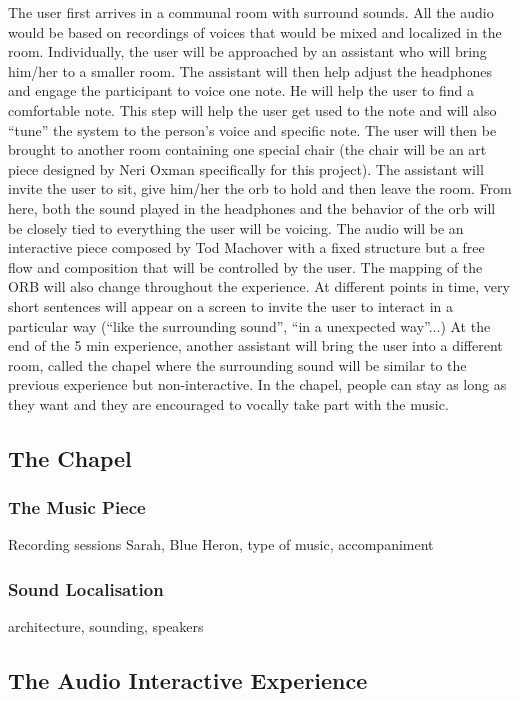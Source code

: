 \documentclass{nime-alternate}
\begin{document}
The user first arrives in a communal room with surround sounds. All the audio would be based on recordings of voices that would be mixed and localized in the room. Individually, the user will be approached by an assistant who will bring him/her to a smaller room. The assistant will then help adjust the headphones and engage the participant to voice one note. He will help the user to find a comfortable note. This step will help the user get used to the note and will also “tune” the system to the person’s voice and specific note. The user will then be brought to another room containing one special chair (the chair will be an art piece designed by Neri Oxman specifically for this project). The assistant will invite the user to sit, give him/her the orb to hold and then leave the room. From here, both the sound played in the headphones and the behavior of the orb will be closely tied to everything the user will be voicing. The audio will be an interactive piece composed by Tod Machover with a fixed structure but a free flow and composition that will be controlled by the user. The mapping of the ORB will also change throughout the experience. At different points in time, very short sentences will appear on a screen to invite the user to interact in a particular way (“like the surrounding sound”, “in a unexpected way”...) At the end of the 5 min experience, another assistant will bring the user into a different room, called the chapel where the surrounding sound will be similar to the previous experience but non-interactive. In the chapel, people can stay as long as they want and they are encouraged to vocally take part with the music.


\subsection{The Chapel}

\subsubsection{The Music Piece}
Recording sessions
Sarah, Blue Heron, type of music, accompaniment

\subsubsection{Sound Localisation}
architecture, sounding, speakers

\subsection{The Audio Interactive Experience}
\end{document}
